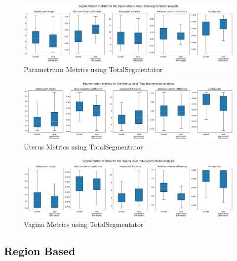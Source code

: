 \documentclass[11pt,twoside]{report}
\begin{document}
\begin{landscape}
  \begin{figure}[H]
    \centering
    \includegraphics[width=\linewidth]{../../research/source/code/data/metrics/metricsparametrium_1_combinednotable_TotalSegmentator_analysis.png}
    \caption{Parametrium Metrics using TotalSegmentator}\label{fig:totalsegmentator-metrics-parametrium}
  \end{figure}

  \begin{figure}[H]
    \centering
    \includegraphics[width=\linewidth]{../../research/source/code/data/metrics/metricsuterus_1_combinednotable_TotalSegmentator_analysis.png}
    \caption{Uterus Metrics using TotalSegmentator}\label{fig:totalsegmentator-metrics-uterus}
  \end{figure}

  \begin{figure}[H]
    \centering
    \includegraphics[width=\linewidth]{../../research/source/code/data/metrics/metricsvagina_1_combinednotable_TotalSegmentator_analysis.png}
    \caption{Vagina Metrics using TotalSegmentator}\label{fig:totalsegmentator-metrics-vagina}
  \end{figure}

\end{landscape}

\subsection{Region Based}\label{sect:region-based-Appendix}
\end{document}
